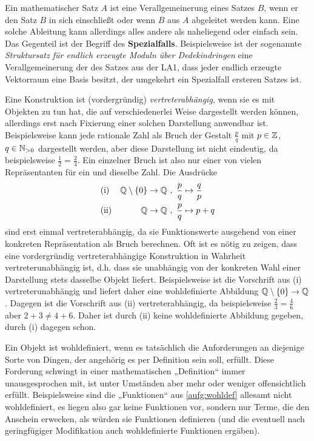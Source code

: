 \begin{description}[labelindent=0pt, leftmargin=0pt]
    \item[Verallgemeinerung:] Ein mathematischer Satz $A$ ist eine Verallgemeinerung eines Satzes $B$, wenn er den Satz $B$ in sich einschließt oder wenn $B$ aus $A$ abgeleitet werden kann. Eine solche Ableitung kann allerdings alles andere als naheliegend oder einfach sein. Das Gegenteil ist der Begriff des \textbf{Spezialfalls}. Beispielsweise ist der sogenannte \emph{Struktursatz für endlich erzeugte Moduln über Dedekindringen} eine Verallgemeinerung der des Satzes aus der LA1, dass jeder endlich erzeugte Vektorraum eine Basis besitzt, der umgekehrt ein Spezialfall ersteren Satzes ist.
    
    \item[Vertreterabhängig:] Eine Konstruktion ist (vordergründig) \emph{vertreterabhängig}, wenn sie es mit Objekten zu tun hat, die auf verschiedenerlei Weise dargestellt werden können, allerdings erst nach Fixierung einer solchen Darstellung anwendbar ist. Beispielsweise kann jede rationale Zahl als Bruch der Gestalt $\frac{p}{q}$ mit $p\in \mathbb Z$, $q\in \mathbb N_{>0}$ dargestellt werden, aber diese Darstellung ist nicht eindeutig, da beispielsweise $\frac{1}{2}=\frac{2}{4}$. Ein einzelner Bruch ist also nur einer von vielen Repräsentanten für ein und dieselbe Zahl. Die Ausdrücke
    \begin{align*}
        &\text{(i)} & \Q\setminus \{0\} \to \Q \ & ,\ \frac{p}{q} \mapsto \frac{q}{p} \\
        &\text{(ii)} & \Q \to \Q \ & ,\ \frac{p}{q} \mapsto p+q
    \end{align*}
    sind erst einmal vertreterabhängig, da sie Funktionswerte ausgehend von einer konkreten Repräsentation als Bruch berechnen. Oft ist es nötig zu zeigen, dass eine vordergründig vertreterabhängige Konstruktion in Wahrheit vertreterunabhängig ist, d.h. dass sie unabhängig von der konkreten Wahl einer Darstellung stets dasselbe Objekt liefert. Beispielsweise ist die Vorschrift aus (i) vertreterunabhängig und liefert daher eine wohldefinierte Abbildung $\mathbb Q\setminus \{0\}\to \mathbb Q$. Dagegen ist die Vorschrift aus (ii) vertreterabhängig, da beispielsweise $\frac{2}{3}=\frac{4}{6}$ aber $2+3\neq 4+6$. Daher ist durch (ii) keine wohldefinierte Abbildung gegeben, durch (i) dagegen schon.
    
    \item[Wohldefiniert:] Ein Objekt ist wohldefiniert, wenn es tatsächlich die Anforderungen an diejenige Sorte von Dingen, der angehörig es per Definition sein soll, erfüllt. Diese Forderung schwingt in einer mathematischen „Definition“ immer unausgesprochen mit, ist unter Umständen aber mehr oder weniger offensichtlich erfüllt. Beispielsweise sind die „Funktionen“ aus \cref{aufg:wohldef} allesamt nicht wohldefiniert, es liegen also gar keine Funktionen vor, sondern nur Terme, die den Anschein erwecken, als würden sie Funktionen definieren (und die eventuell nach geringfügiger Modifikation auch wohldefinierte Funktionen ergäben).
    
\end{description}
